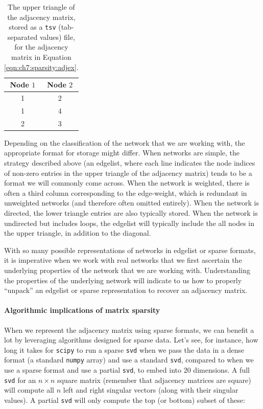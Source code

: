 \begin{table}[h]
    \centering
    \begin{tabular}{c| c}
        Node $1$ & Node $2$  \\
        \hline
         1 & 2\\
         1 & 4 \\
         2 & 3
    \end{tabular}
    \caption[Edgelist network storage format]{The upper triangle of the adjacency matrix, stored as a \texttt{tsv} (tab-separated values) file, for the adjacency matrix in Equation \eqref{eqn:ch7:sparsity:adjex}.}
    \label{tab:adjlist}
\end{table}

Depending on the classification of the network that we are working with, the appropriate format for storage might differ. When networks are simple, the strategy described above (an edgelist, where each line indicates the node indices of non-zero entries in the upper triangle of the adjacency matrix) tends to be a format we will commonly come across. When the network is weighted, there is often a third column corresponding to the edge-weight, which is redundant in unweighted networks (and therefore often omitted entirely). When the network is directed, the lower triangle entries are also typically stored. When the network is undirected but includes loops, the edgelist will typically include the all nodes in the upper triangle, in addition to the diagonal. 

With so many possible representations of networks in edgelist or sparse formats, it is imperative when we work with real networks that we first ascertain the underlying properties of the network that we are working with. Understanding the properties of the underlying network will indicate to us how to properly ``unpack'' an edgelist or sparse representation to recover an adjacency matrix.

\paragraph*{Algorithmic implications of matrix sparsity}

When we represent the adjacency matrix using sparse formats, we can benefit a lot by leveraging algorithms designed for sparse data. Let's see, for instance, how long it takes for \texttt{scipy} to run a sparse \texttt{svd} when we pass the data in a dense format (a standard \texttt{numpy} array) and use a standard \texttt{svd}, compared to when we use a sparse format and use a partial \texttt{svd}, to embed into $20$ dimensions. A full \texttt{svd} for an $n \times n$ square matrix (remember that adjacency matrices are square) will compute all $n$ left and right singular vectors (along with their singular values). A partial \texttt{svd} will only compute the top (or bottom) subset of these:

